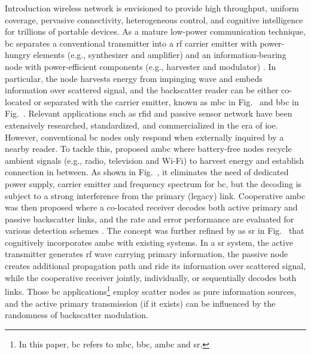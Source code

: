 \documentclass[journal,12pt,onecolumn,draftclsnofoot]{IEEEtran}
\theoremstyle{remark}
\begin{document}
\glsresetall

\begin{section}{Introduction}
	 wireless network is envisioned to provide high throughput, uniform coverage, pervasive connectivity, heterogeneous control, and cognitive intelligence for trillions of portable devices.
	As a mature low-power communication technique, \gls{bc} separates a conventional transmitter into a \gls{rf} carrier emitter with power-hungry elements (e.g., synthesizer and amplifier) and an information-bearing node with power-efficient components (e.g., harvester and modulator) \cite{Boyer2014}.
	In particular, the node harvests energy from impinging wave and embeds information over scattered signal, and the backscatter reader can be either co-located or separated with the carrier emitter, known as \gls{mbc} in Fig.~ and \gls{bbc} in Fig.~.
	Relevant applications such as \gls{rfid} \cite{Dobkin2012,Landt2005} and passive sensor network \cite{Vannucci2008,Assimonis2016} have been extensively researched, standardized, and commercialized in the era of \gls{ioe}.
	However, conventional \gls{bc} nodes only respond when externally inquired by a nearby reader.
	To tackle this, \cite{Liu2013b} proposed \gls{ambc} where battery-free nodes recycle ambient signals (e.g., radio, television and Wi-Fi) to harvest energy and establish connection in between.
	As shown in Fig.~, it eliminates the need of dedicated power supply, carrier emitter and frequency spectrum for \gls{bc}, but the decoding is subject to a strong interference from the primary (legacy) link.
	Cooperative \gls{ambc} was then proposed where a co-located receiver decodes both active primary and passive backscatter links, and the rate and error performance are evaluated for various detection schemes \cite{Yang2018}.
	The concept was further refined by \cite{Liang2020} as \gls{sr} in Fig.~ that cognitively incorporates \gls{ambc} with existing systems.
	In a \gls{sr} system, the active transmitter generates \gls{rf} wave carrying primary information, the passive node creates additional propagation path and ride its information over scattered signal, while the cooperative receiver jointly, individually, or sequentially decodes both links.
	Those \gls{bc} applications\footnote{In this paper, \gls{bc} refers to \gls{mbc}, \gls{bbc}, \gls{ambc} and \gls{sr}.} employ scatter nodes as pure information sources, and the active primary transmission (if it exists) can be influenced by the randomness of backscatter modulation.

\end{section}
\end{document}
